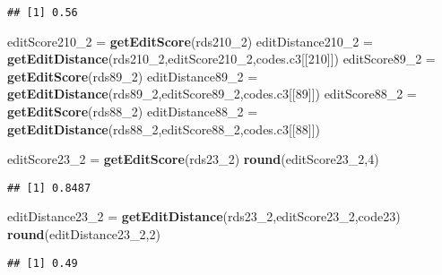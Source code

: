 \documentclass[
]{article}
\newenvironment{Shaded}{\begin{snugshade}}{\end{snugshade}}
\newcommand{\DecValTok}[1]{\textcolor[rgb]{0.00,0.00,0.81}{#1}}
\newcommand{\KeywordTok}[1]{\textcolor[rgb]{0.13,0.29,0.53}{\textbf{#1}}}
\newcommand{\NormalTok}[1]{#1}
\newcommand{\StringTok}[1]{\textcolor[rgb]{0.31,0.60,0.02}{#1}}
\begin{document}
\begin{verbatim}
## [1] 0.56
\end{verbatim}

\begin{Shaded}
\begin{Highlighting}[]
\NormalTok{editScore210_}\DecValTok{2}\NormalTok{ =}\StringTok{ }\KeywordTok{getEditScore}\NormalTok{(rds210_}\DecValTok{2}\NormalTok{)}
\NormalTok{editDistance210_}\DecValTok{2}\NormalTok{ =}\StringTok{ }\KeywordTok{getEditDistance}\NormalTok{(rds210_}\DecValTok{2}\NormalTok{,editScore210_}\DecValTok{2}\NormalTok{,codes.c3[[}\DecValTok{210}\NormalTok{]])}
\NormalTok{editScore89_}\DecValTok{2}\NormalTok{ =}\StringTok{ }\KeywordTok{getEditScore}\NormalTok{(rds89_}\DecValTok{2}\NormalTok{)}
\NormalTok{editDistance89_}\DecValTok{2}\NormalTok{ =}\StringTok{ }\KeywordTok{getEditDistance}\NormalTok{(rds89_}\DecValTok{2}\NormalTok{,editScore89_}\DecValTok{2}\NormalTok{,codes.c3[[}\DecValTok{89}\NormalTok{]])}
\NormalTok{editScore88_}\DecValTok{2}\NormalTok{ =}\StringTok{ }\KeywordTok{getEditScore}\NormalTok{(rds88_}\DecValTok{2}\NormalTok{)}
\NormalTok{editDistance88_}\DecValTok{2}\NormalTok{ =}\StringTok{ }\KeywordTok{getEditDistance}\NormalTok{(rds88_}\DecValTok{2}\NormalTok{,editScore88_}\DecValTok{2}\NormalTok{,codes.c3[[}\DecValTok{88}\NormalTok{]])}

\NormalTok{editScore23_}\DecValTok{2}\NormalTok{ =}\StringTok{ }\KeywordTok{getEditScore}\NormalTok{(rds23_}\DecValTok{2}\NormalTok{)}
\KeywordTok{round}\NormalTok{(editScore23_}\DecValTok{2}\NormalTok{,}\DecValTok{4}\NormalTok{)}
\end{Highlighting}
\end{Shaded}

\begin{verbatim}
## [1] 0.8487
\end{verbatim}

\begin{Shaded}
\begin{Highlighting}[]
\NormalTok{editDistance23_}\DecValTok{2}\NormalTok{ =}\StringTok{ }\KeywordTok{getEditDistance}\NormalTok{(rds23_}\DecValTok{2}\NormalTok{,editScore23_}\DecValTok{2}\NormalTok{,code23)}
\KeywordTok{round}\NormalTok{(editDistance23_}\DecValTok{2}\NormalTok{,}\DecValTok{2}\NormalTok{)}
\end{Highlighting}
\end{Shaded}

\begin{verbatim}
## [1] 0.49
\end{verbatim}
\end{document}
